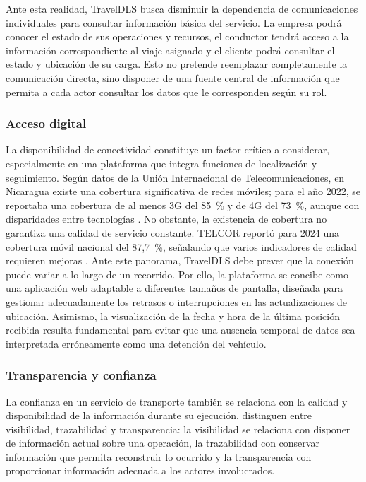 Ante esta realidad, TravelDLS busca disminuir la dependencia de comunicaciones individuales para consultar información básica del servicio. La empresa podrá conocer el estado de sus operaciones y recursos, el conductor tendrá acceso a la información correspondiente al viaje asignado y el cliente podrá consultar el estado y ubicación de su carga. Esto no pretende reemplazar completamente la comunicación directa, sino disponer de una fuente central de información que permita a cada actor consultar los datos que le corresponden según su rol.

\subsubsection{Acceso digital}
\label{sec:acceso-digital}

La disponibilidad de conectividad constituye un factor crítico a considerar, especialmente en una plataforma que integra funciones de localización y seguimiento. Según datos de la Unión Internacional de Telecomunicaciones, en Nicaragua existe una cobertura significativa de redes móviles; para el año 2022, se reportaba una cobertura de al menos 3G del 85~\% y de 4G del 73~\%, aunque con disparidades entre tecnologías \parencite{ituDigitalNicaragua}. No obstante, la existencia de cobertura no garantiza una calidad de servicio constante. TELCOR reportó para 2024 una cobertura móvil nacional del 87,7~\%, señalando que varios indicadores de calidad requieren mejoras \parencite{telcor2024calidad}. Ante este panorama, TravelDLS debe prever que la conexión puede variar a lo largo de un recorrido. Por ello, la plataforma se concibe como una aplicación web adaptable a diferentes tamaños de pantalla, diseñada para gestionar adecuadamente los retrasos o interrupciones en las actualizaciones de ubicación. Asimismo, la visualización de la fecha y hora de la última posición recibida resulta fundamental para evitar que una ausencia temporal de datos sea interpretada erróneamente como una detención del vehículo.

\subsubsection{Transparencia y confianza}
\label{sec:transparencia-confianza}

La confianza en un servicio de transporte también se relaciona con la calidad y disponibilidad de la información durante su ejecución. \textcite{nie2026visibility} distinguen entre visibilidad, trazabilidad y transparencia: la visibilidad se relaciona con disponer de información actual sobre una operación, la trazabilidad con conservar información que permita reconstruir lo ocurrido y la transparencia con proporcionar información adecuada a los actores involucrados.

